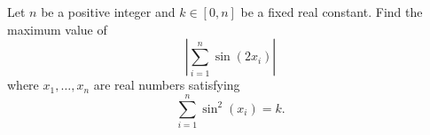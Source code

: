 Let $n$ be a positive integer and $k\in[0,n]$ be a fixed real constant. Find the maximum value of $$\left|\sum_{i=1}^n\sin(2x_i)\right|$$where $x_1,\ldots,x_n$ are real numbers satisfying  $$\sum_{i=1}^n\sin^2(x_i)=k.$$